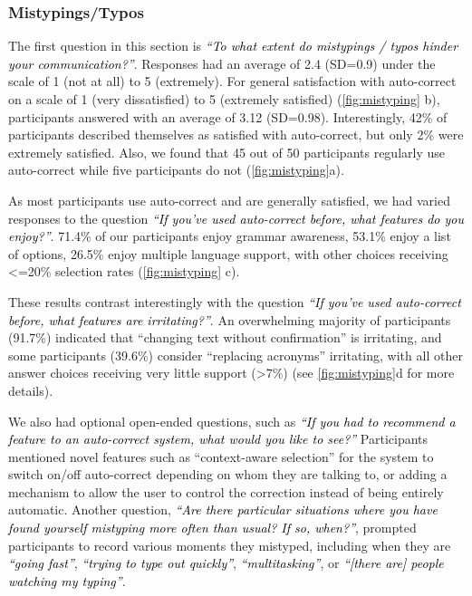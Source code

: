 \documentclass[acmsmall,screen,authorversion,nonacm]{acmart}
\newcommand{\QUOTE}[1]{\textsf{\textit{\textcolor{black}{``#1''}}}}
\begin{document}
\subsubsection{Mistypings/Typos}


The first question in this section is \QUOTE{To what extent do mistypings / typos hinder your communication?}. Responses had an average of 2.4 (SD=0.9) under the scale of 1 (not at all) to 5 (extremely). For general satisfaction with auto-correct on a scale of 1 (very dissatisfied) to 5 (extremely satisfied) (\autoref{fig:mistyping} b), participants answered with an average of 3.12 (SD=0.98). Interestingly, 42\% of participants described themselves as satisfied with auto-correct, but only 2\% were extremely satisfied. Also, we found that 45 out of 50 participants regularly use auto-correct while five participants do not (\autoref{fig:mistyping}a). 

As most participants use auto-correct and are generally satisfied, we had varied responses to the question \QUOTE{If you've used auto-correct before, what features do you enjoy?}. 71.4\% of our participants enjoy grammar awareness, 53.1\% enjoy a list of options, 26.5\% enjoy multiple language support, with other choices receiving <=20\% selection rates (\autoref{fig:mistyping} c). 

These results contrast interestingly with the question \QUOTE{If you've used auto-correct before, what features are irritating?}. An overwhelming majority of participants (91.7\%) indicated that ``changing text without confirmation'' is irritating, and some participants (39.6\%) consider ``replacing acronyms'' irritating, with all other answer choices receiving very little support (>7\%) (see \autoref{fig:mistyping}d for more details).

We also had optional open-ended questions, such as \QUOTE{If you had to recommend a feature to an auto-correct system, what would you like to see?} Participants mentioned novel features such as ``context-aware selection'' for the system to switch on/off auto-correct depending on whom they are talking to, or adding a mechanism to allow the user to control the correction instead of being entirely automatic. Another question, \QUOTE{Are there particular situations where you have found yourself mistyping more often than usual? If so, when?}, prompted participants to record various moments they mistyped, including when they are \QUOTE{going fast}, \QUOTE{trying to type out quickly},  \QUOTE{multitasking}, or \QUOTE{[there are] people watching my typing}.   
\end{document}
